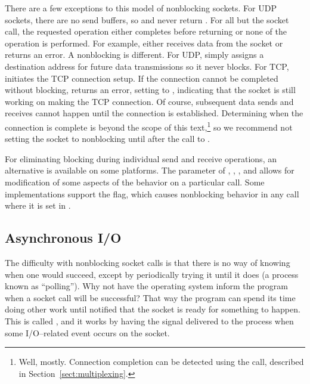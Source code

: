 There are a few exceptions to this model of nonblocking
sockets.  For UDP sockets, there are no send
buffers, so  and 
never return .  For all but the
 socket
call, the requested operation either completes before returning
or none of the operation is performed.  For
example,  either receives data from the socket or
returns an error.  A nonblocking  is
different.
For UDP,  simply assigns a destination
address for
future data transmissions so it never blocks.  For TCP,
 initiates the TCP connection setup. 
If the connection cannot be completed without blocking,
 returns an error, setting  to
, indicating that the socket is still
working on
making the TCP connection.   Of course, subsequent data sends and
receives cannot happen until the connection is established.
Determining when the connection is complete is beyond the scope of
this text,\footnote{Well, mostly.
Connection completion can be detected using the
 call, described in
Section~\ref{sect:multiplexing}.} so we
recommend not setting the socket to nonblocking until after the call
to .

For eliminating blocking during individual send and receive operations,
an alternative is available on some platforms.
The  parameter of , ,
, and  allows for modification
of some aspects of the behavior on a particular call.
Some implementations support the
 flag, which
causes nonblocking behavior in
any call where it is set in .

\subsection{Asynchronous I/O}

\noindent The difficulty with nonblocking socket calls is that there is no way
of knowing when one would succeed, except by periodically trying it
until it does (a process known as ``polling'').  Why not have the
operating system inform the program when a socket call will be
successful?  That way the program can spend its time doing other work
until notified that the socket is ready for something to happen.  This
is called , and it works
by having the
 signal delivered to the process when some I/O--related
event occurs on the socket.


